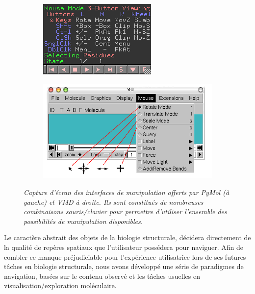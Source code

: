 \begin{figure}[h]
  \begin{subfigure}{.5\textwidth}
  \centering
  {\includegraphics[width=0.9\linewidth]{./figures/ch3/pymol_nav}}
  \caption{}
  \label{Fig:pymol_nav}
  \end{subfigure}
  \begin{subfigure}{.5\textwidth}
  \centering
  {\includegraphics[width=0.9\linewidth]{./figures/ch3/vmd_nav}}
  \hspace{0.3cm}
  \label{Fig:vmd_nav}
  \end{subfigure}
  \caption[Captures d'écran des menus de navigation au sein de PyMol et VMD.]{\it Capture d'écran des interfaces de manipulation offerts par PyMol (à gauche) et VMD à droite. Ils sont constitués de nombreuses combinaisons souris/clavier pour permettre d'utiliser l'ensemble des possibilités de manipulation disponibles.
  }
\end{figure}


Le caractère abstrait des objets de la biologie structurale, décidera directement de la qualité de repères spatiaux que l'utilisateur possédera pour naviguer. Afin de combler ce manque préjudiciable pour l'expérience utilisatrice lors de ses futures tâches en biologie structurale, nous avons développé une série de paradigmes de navigation, basées sur le contenu observé et les tâches usuelles en visualisation/exploration moléculaire.

